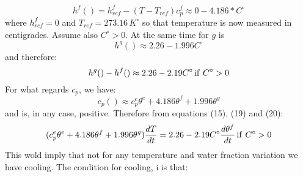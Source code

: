 \begin{equation}
h^f() = h^f_{ref} -(T-T_{ref})c_p^f \approx 0 - 4.186*  C^\circ   
\end{equation}
where \(h_{ref}^f=0\) and \(T_{ref} = 273.16\, K^\circ\) so that temperature is now measured in centigrades. Assume also \(C^\circ >0 \).
At the same time for \(g\) is 
\begin{equation}
h^g( ) \approx 2.26  - 1.996 C^\circ
\end{equation}
and therefore:
\begin{equation}
h^g()-h^f() \approx 2.26 - 2.19 C^\circ \, {\rm if}\ C^\circ > 0
\end{equation}
For what regards \( c_p\), we have:
\begin{equation}
c_p() \approx c_p^e \theta^e + 4.186 \theta^f + 1.996 \theta^g
\end{equation}
and is, in any case, positive.
Therefore from equations (15), (19) and (20):
\begin{equation}
(c_p^e \theta^e + 4.186 \theta^f + 1.996 \theta^g) \frac{dT}{dt} = 2.26 - 2.19 C^\circ \frac{d\theta^f}{dt}\, {\rm if}\ C^\circ > 0
\end{equation}
This wold imply that not for any temperature and water fraction variation we have cooling. The condition for cooling, i is that:
\begin{equation}
\end{equation}